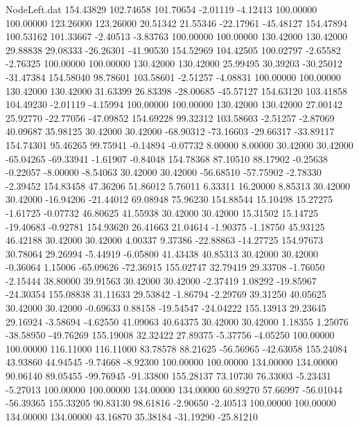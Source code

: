 \begin{filecontents}{NodeLeft.dat}
 154.43829  102.74658  101.70654    -2.01119   -4.12413  100.00000  100.00000  123.26000  123.26000   20.51342   21.55346  -22.17961  -45.48127
 154.47894  100.53162  101.33667    -2.40513   -3.83763  100.00000  100.00000  130.42000  130.42000   29.88838   29.08333  -26.26301  -41.90530
 154.52969  104.42505  100.02797    -2.65582   -2.76325  100.00000  100.00000  130.42000  130.42000   25.99495   30.39203  -30.25012  -31.47384
 154.58040   98.78601  103.58601    -2.51257   -4.08831  100.00000  100.00000  130.42000  130.42000   31.63399   26.83398  -28.00685  -45.57127
 154.63120  103.41858  104.49230    -2.01119   -4.15994  100.00000  100.00000  130.42000  130.42000   27.00142   25.92770  -22.77056  -47.09852
 154.69228   99.32312  103.58603    -2.51257   -2.87069   40.09687   35.98125   30.42000   30.42000  -68.90312  -73.16603  -29.66317  -33.89117
 154.74301   95.46265   99.75941    -0.14894   -0.07732    8.00000    8.00000   30.42000   30.42000  -65.04265  -69.33941   -1.61907   -0.84048
 154.78368   87.10510   88.17902    -0.25638   -0.22057   -8.00000   -8.54063   30.42000   30.42000  -56.68510  -57.75902   -2.78330   -2.39452
 154.83458   47.36206   51.86012     5.76011    6.33311   16.20000    8.85313   30.42000   30.42000  -16.94206  -21.44012   69.08948   75.96230
 154.88544   15.10498   15.27275    -1.61725   -0.07732   46.80625   41.55938   30.42000   30.42000   15.31502   15.14725  -19.40683   -0.92781
 154.93620   26.41663   21.04614    -1.90375   -1.18750   45.93125   46.42188   30.42000   30.42000    4.00337    9.37386  -22.88863  -14.27725
 154.97673   30.78064   29.26994    -5.44919   -6.05800   41.43438   40.85313   30.42000   30.42000   -0.36064    1.15006  -65.09626  -72.36915
 155.02747   32.79419   29.33708    -1.76050   -2.15444   38.80000   39.91563   30.42000   30.42000   -2.37419    1.08292  -19.85967  -24.30354
 155.08838   31.11633   29.53842    -1.86794   -2.29769   39.31250   40.05625   30.42000   30.42000   -0.69633    0.88158  -19.54547  -24.04222
 155.13913   29.23645   29.16924    -3.58694   -4.62550   41.09063   40.64375   30.42000   30.42000    1.18355    1.25076  -38.58950  -49.76269
 155.19008   32.32422   27.89375    -5.37756   -4.05250  100.00000  100.00000  116.11000  116.11000   83.78578   88.21625  -56.56965  -42.63058
 155.24084   43.93860   44.94545    -9.74668   -8.92300  100.00000  100.00000  134.00000  134.00000   90.06140   89.05455  -99.76945  -91.33800
 155.28137   73.10730   76.33003    -5.23431   -5.27013  100.00000  100.00000  134.00000  134.00000   60.89270   57.66997  -56.01044  -56.39365
 155.33205   90.83130   98.61816    -2.90650   -2.40513  100.00000  100.00000  134.00000  134.00000   43.16870   35.38184  -31.19290  -25.81210

\end{filecontents}
